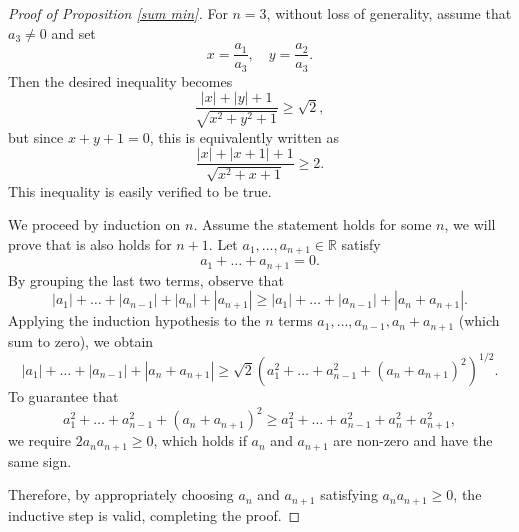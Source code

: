 \documentclass[10pt]{amsart}
\newcommand{\1}{\textbf{1}}
\numberwithin{equation}{section} %
\theoremstyle{remark}
\theoremstyle{definition}
\begin{document}
\begin{proof}[Proof of Proposition \ref{sum min}]
For $n = 3$, without loss of generality, assume that $a_3 \neq 0$ and set 
\[
x = \frac{a_1}{a_3}, \quad y = \frac{a_2}{a_3}.
\]
Then the desired inequality becomes
\[
\frac{|x| + |y| + 1}{\sqrt{x^2 + y^2 + 1}} \geq \sqrt{2},
\]
but since \( x + y + 1 = 0 \), this is equivalently written as
\[
\frac{|x| + |x + 1| + 1}{\sqrt{x^2 + x + 1}} \geq 2.
\]
This inequality is easily verified to be true.

We proceed by induction on $n$. Assume the statement holds for some $n$, we will prove that is also holds for $n+1$. Let $a_1, \ldots, a_{n+1} \in \mathbb{R}$ satisfy
\[
a_1 + \ldots + a_{n+1} = 0.
\]
By grouping the last two terms, observe that
\[
|a_1| + \ldots + |a_{n-1}| + |a_{n}| + |a_{n+1}| 
\geq |a_1| + \ldots + |a_{n-1}| + |a_{n} + a_{n+1}|.
\]
Applying the induction hypothesis to the $n$ terms $a_1, \ldots, a_{n-1}, a_{n} + a_{n+1}$ (which sum to zero), we obtain
\[
|a_1| + \ldots + |a_{n-1}| + |a_{n} + a_{n+1}| \geq \sqrt{2} \left( a_1^2 + \ldots + a_{n-1}^2 + (a_{n} + a_{n+1})^2 \right)^{1/2}.
\]
To guarantee that
\[
a_1^2 + \ldots + a_{n-1}^2 + (a_{n} + a_{n+1})^2 \geq a_1^2 + \ldots + a_{n-1}^2 + a_{n}^2 + a_{n+1}^2,
\]
we require $2a_{n}a_{n+1} \geq 0$, which holds if $a_{n}$ and $a_{n+1}$ are non-zero and have the same sign.

Therefore, by appropriately choosing $a_{n}$ and $a_{n+1}$ satisfying $a_{n}a_{n+1} \geq 0$, the inductive step is valid, completing the proof.
\end{proof}
\end{document}
